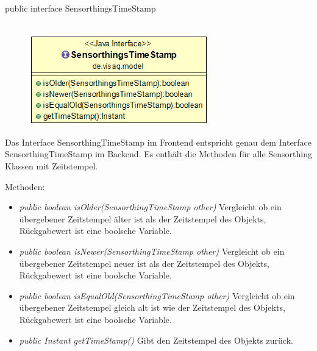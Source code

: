 public interface SensorthingsTimeStamp
\\\\
\begin{minipage}{0.3\textwidth}
	\begin{figure}[H]
		\includegraphics[scale = 0.5
		]{media/frontend/model/SensorthingTimeStampClass.png}
	\end{figure}
\end{minipage} \hfill
\begin{minipage}{0.6\textwidth}
	Das Interface SensorthingTimeStamp im Frontend entspricht genau dem Interface SensorthingTimeStamp im Backend. Es enthält die Methoden für alle Sensorthing Klassen mit Zeitstempel.
\end{minipage}

Methoden:
\begin{itemize} 
	\item \emph{public boolean isOlder(SensorthingTimeStamp other)} Vergleicht ob ein übergebener Zeitstempel älter ist als der Zeitstempel des Objekts, Rückgabewert ist eine boolsche Variable.
	\item \emph{public boolean isNewer(SensorthingTimeStamp other)} Vergleicht ob ein übergebener Zeitstempel neuer ist als der Zeitstempel des Objekts, Rückgabewert ist eine boolsche Variable.
	\item \emph{public boolean isEqualOld(SensorthingTimeStamp other)} Vergleicht ob ein übergebener Zeitstempel gleich alt ist wie der Zeitstempel des Objekts, Rückgabewert ist eine boolsche Variable.
	\item \emph{public Instant getTimeStamp()} Gibt den Zeitstempel des Objekts zurück.
\end{itemize}


